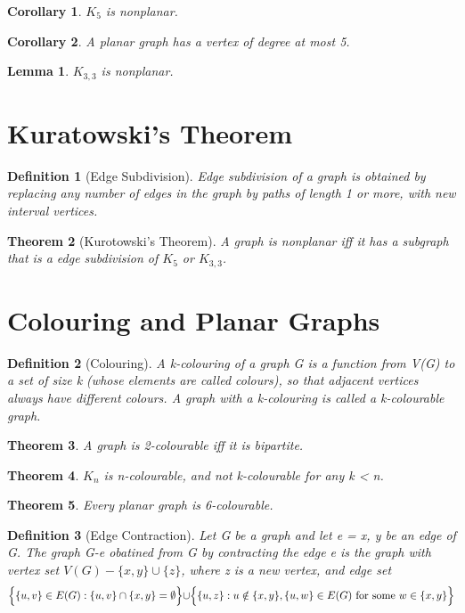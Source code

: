 \documentclass[11pt, oneside]{book}
\theoremstyle{break}
\newtheorem{thm}{Theorem}[section]
\newtheorem{crly}{Corollary}[thm]
\newtheorem{lemma}[thm]{Lemma}
\newtheorem{defn}{Definition}[section]
\begin{document}
\begin{crly}
	$K_5$ is nonplanar.
\end{crly}

\begin{crly}
	A planar graph has a vertex of degree at most 5.
\end{crly}

\begin{lemma}
	$K_{3, 3}$ is nonplanar.
\end{lemma}


\section{Kuratowski's Theorem}

\begin{defn}[Edge Subdivision]
	Edge subdivision of a graph is obtained by replacing any number of edges in the graph by paths of length 1 or more, with new interval vertices.
\end{defn}

\begin{thm}[Kurotowski's Theorem]
	A graph is nonplanar iff it has a subgraph that is a edge subdivision of $K_5$ or $K_{3, 3}$.
\end{thm}


\section{Colouring and Planar Graphs}

\begin{defn}[Colouring]
	A k-colouring of a graph G is a function from V(G) to a set of size k (whose elements are called colours), so that adjacent vertices always have different colours. A graph with a k-colouring is called a k-colourable graph.
\end{defn}

\begin{thm}
	A graph is 2-colourable iff it is bipartite.
\end{thm}

\begin{thm}
	$K_n$ is n-colourable, and not k-colourable for any k < n.
\end{thm}

\begin{thm}
	Every planar graph is 6-colourable.
\end{thm}

\begin{defn}[Edge Contraction]
	Let G be a graph and let e = {x, y} be an edge of G. The graph G-e obatined from G by contracting the edge e is the graph with vertex set $V(G) - \{x, y\} \cup \{z\}$, where z is a new vertex, and edge set
	\[
		\Bigr\{\{u, v\} \in E(G) : \{u, v\}\cap\{x, y\}=\emptyset\Bigl\}\cup\Bigr\{\{u, z\}:u\notin\{x,y\},\{u, w\}\in E(G) \text{ for some } w\in\{x, y\}\Bigl\}
	\]
\end{defn}
\end{document}

